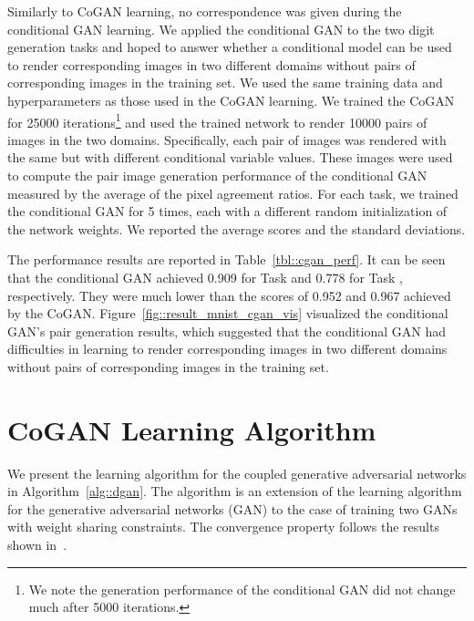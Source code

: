 \documentclass{article}
\begin{document}
Similarly to CoGAN learning, no correspondence was given during the conditional GAN learning. We applied the conditional GAN to the two digit generation tasks and hoped to answer whether a conditional model can be used to render corresponding images in two different domains without pairs of corresponding images in the training set. We used the same training data and hyperparameters as those used in the CoGAN learning. We trained the CoGAN for 25000 iterations\footnote{
We note the generation performance of the conditional GAN did not change much after 5000 iterations.} and used the trained network to render 10000 pairs of images in the two domains. Specifically, each pair of images was rendered with the same  but with different conditional variable values. These images were used to compute the pair image generation performance of the conditional GAN measured by the average of the pixel agreement ratios. For each task, we trained the conditional GAN for 5 times, each with a different random initialization of the network weights. We reported the average scores and the standard deviations.

The performance results are reported in Table~\ref{tbl::cgan_perf}. It can be seen that the conditional GAN achieved 0.909 for Task  and 0.778 for Task , respectively. They were much lower than the scores of 0.952 and 0.967 achieved by the CoGAN. Figure~\ref{fig::result_mnist_cgan_vis} visualized the conditional GAN's pair generation results, which suggested that the conditional GAN had difficulties in learning to render corresponding images in two different domains without pairs of corresponding images in the training set. 





\clearpage 
\section{CoGAN Learning Algorithm}\label{subsec::learning}

We present the learning algorithm for the coupled generative adversarial networks in Algorithm~\ref{alg::dgan}. The algorithm is an extension of the learning algorithm for the generative adversarial networks (GAN) to the case of training two GANs with weight sharing constraints. The convergence property follows the results shown in~\cite{goodfellow2014generative}.
\end{document}
